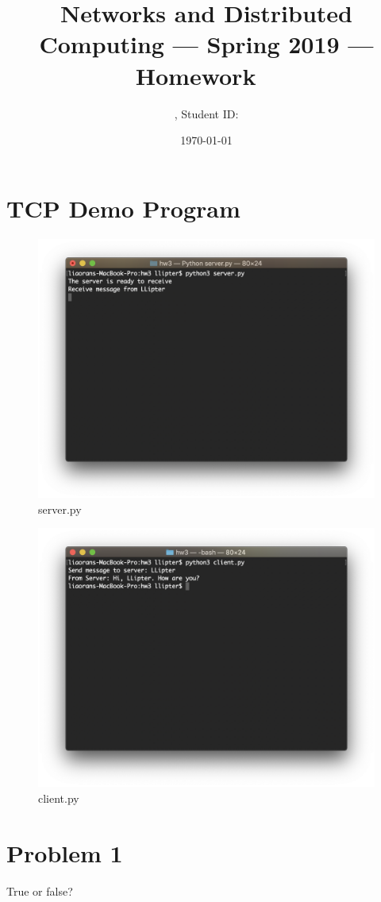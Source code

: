 \documentclass[11pt]{article}
\title{\Large Networks and Distributed Computing --- Spring 2019 --- Homework \Homework\ }
\author{\Name, Student ID: \SID}
\date{\today}
\begin{document}
\maketitle

\section{TCP Demo Program}

\begin{figure}[h]
\centering
\includegraphics[width=.5\textwidth]{server.png}
\caption{\label{fig:server}server.py}
\end{figure}

\begin{figure}[h]
\centering
\includegraphics[width=.5\textwidth]{client.png}
\caption{\label{fig:client}client.py}
\end{figure}

\newpage
\section{Problem 1}

True or false?
\end{document}
